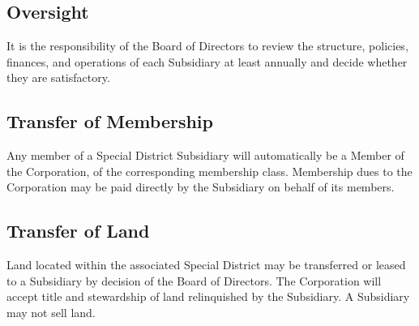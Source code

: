 \subsection{Oversight}
It is the responsibility of the Board of Directors to review the
structure, policies, finances, and operations of each Subsidiary at
least annually and decide whether they are satisfactory.

\subsection{Transfer of Membership}
Any member of a Special District Subsidiary will automatically be a
Member of the Corporation, of the corresponding membership
class. Membership dues to the Corporation may be paid directly by the
Subsidiary on behalf of its members.

\subsection{Transfer of Land}
Land located within the associated Special District may be transferred
or leased to a Subsidiary by decision of the Board of Directors. The
Corporation will accept title and stewardship of land relinquished by
the Subsidiary. A Subsidiary may not sell land.

